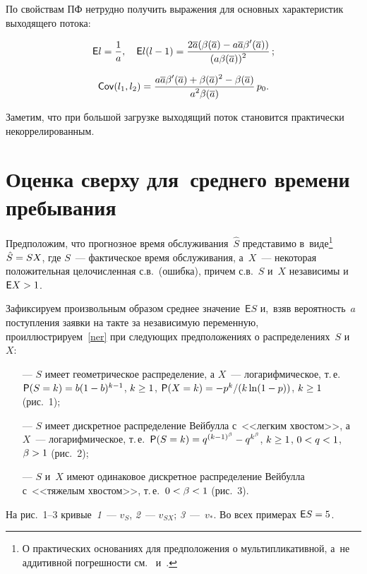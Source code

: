 \begin{multicols}{2}
По свойствам ПФ нетрудно получить выражения для основных
 характеристик выходящего потока:
 
 \noindent
\begin{gather*}
\mathsf{E}l=\displaystyle\frac{\displaystyle 1\mathstrut}{\displaystyle a\mathstrut},
\quad
\mathsf{E}l(l-1) =
\displaystyle\frac{\displaystyle 2\overline{a} (\beta(\overline{a}) - a \overline{a} \beta'(\overline{a}))
\mathstrut}{\displaystyle (a \beta(\overline{a}))^2\mathstrut}\,;
\\[6pt]
\mathsf{Cov}(l_1,l_2)=
\displaystyle\frac{\displaystyle  a \overline{a} \beta'(\overline{a}) + \beta(\overline{a})^2 - 
\beta(\overline{a})\mathstrut}{\displaystyle a^2 \beta(\overline{a})\mathstrut}\, p_0.
\end{gather*}

\noindent
Заметим, что при большой загрузке выходящий поток становится
практически некоррелированным.


\section{Оценка сверху для~среднего времени пребывания}

Предположим, что прогнозное время обслуживания~$\hat S$
представимо в~виде\footnote[2]{О практических основаниях
для предположения о мультипликативной, а~не аддитивной погрешности 
см.~\cite[Secion 6.3]{Mat}
и~\cite{LusMilR}.} $\hat S\hm=SX$,
где $S$~--- фактическое время обслуживания, а~$X$~--- 
некоторая положительная целочисленная
с.в.\ (ошибка), причем с.в.~$S$ и~$X$ независимы и~$\mathsf{E}X\hm>1$.

Зафиксируем произвольным образом среднее значение~$\mathsf{E}S$ 
и,~взяв вероятность~$a$ поступления заявки на такте за независимую переменную,
проиллюстрируем~\eqref{ner} при следующих предположениях о распределениях~$S$ и~$X$:
\begin{itemize}
\item[---] $S$ имеет геометрическое распределение, а $X$~--- логарифмическое, т.\,е.\
$\mathsf{P}(S=k)\hm=b(1-b)^{k-1}$, $k\hm\ge 1$,
$\mathsf{P}(X=k)\hm=-p^k/(k\ln(1-p))$, $k\hm \ge 1$ (рис.~1);
\item[---] $S$ имеет дискретное распределение Вейбулла с~<<легким хвостом>>, а~$X$~--- 
логарифмическое, т.\,е.\ $\mathsf{P}(S=k)\hm=q^{(k-1)^{\beta}}
\hm-q^{k^{\beta}}$, $k\hm\ge 1$, $0\hm<q\hm<1$, $\beta\hm>1$ (рис.~2);
\item[---] $S$ и~$X$ имеют одинаковое дискретное распределение 
Вейбулла с~<<тяжелым хвостом>>, т.\,е.\ $0\hm<\beta\hm<1$ (рис.~3).
\end{itemize}

На рис.~1--3 кривые~\textit{1}~--- $v_{S}$, \textit{2}~--- $v_{SX}$; 
\textit{3}~---~$v_*$.
Во всех примерах $\mathsf{E}S\hm=5$.





\end{multicols}
